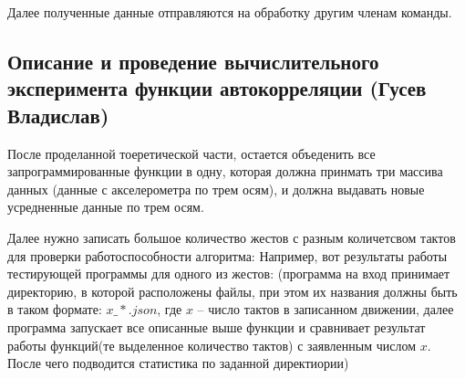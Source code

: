 Далее полученные данные отправляются на обработку другим членам команды.

\subsection{Описание и проведение вычислительного эксперимента функции автокорреляции (Гусев Владислав)}
После проделанной тоеретической части, остается объеденить все запрограммированные функции в одну, которая должна принмать три массива данных (данные с акселерометра по трем осям), и должна выдавать новые усредненные данные по трем осям.

Далее нужно записать большое количество жестов с разным количетсвом тактов для проверки работоспособности алгоритма:
Например, вот результаты работы тестирующей программы для одного из жестов:
(программа на вход принимает директорию, в которой расположены файлы, при этом их названия должны быть в таком формате: $x\_*.json$, где $x$ -- число тактов в записанном движении, далее программа запускает все описанные выше функции и сравнивает результат работы функций(те выделенное количество тактов) с заявленным числом $x$. После чего подводится статистика по заданной директиории)

\begin{figure}[H]
\end{figure}

